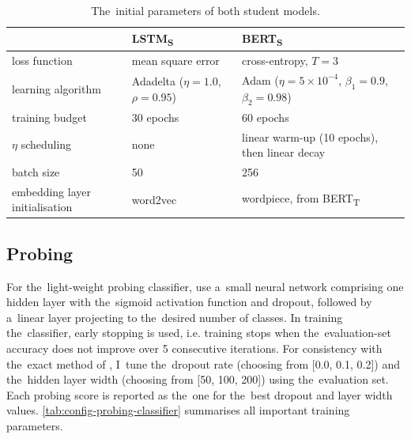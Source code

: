 \documentclass[bsc,frontabs,singlespacing,parskip,deptreport]{infthesis}
\def\BERTT{BERT\textsubscript{T}}
\def\BERTS{BERT\textsubscript{S}}
\def\LSTMS{LSTM\textsubscript{S}}
\begin{document}
{{{      \begin{table}[h!tb]
      \centering
      \footnotesize
      \begin{tabular}{P{0.18\textwidth} m{0.3\textwidth} m{0.3\textwidth} }
      \toprule
      & \LSTMS & \BERTS \\
      \toprule
      loss function & mean square error & cross-entropy, $T=3$ \\
      \hline
      learning algorithm & Adadelta ($\eta=1.0$, $\rho=0.95$) &  Adam ($\eta=5\times10^{-4}$, $\beta_1=0.9$, $\beta_2=0.98$) \\
      \hline
      training budget & 30 epochs & 60 epochs \\
      \hline
      $\eta$ scheduling & none & linear warm-up (10 epochs), then linear decay \\
      \hline
      batch size & 50 & 256 \\
      \hline
      embedding layer initialisation & word2vec & wordpiece, from \BERTT \\
      \bottomrule
      \end{tabular}
      \caption{The~initial parameters of both student models.}
      \label{tab:initial-configs}
      \end{table}
    }

    \subsection{Probing}{
      \label{sec:implementation-details-probing}
      For the~light-weight probing classifier, \citet{Conneau_2018} use a~small neural network comprising one hidden layer with the~sigmoid activation function and dropout, followed by a~linear layer projecting to the~desired number of classes. 
      In training the~classifier, early stopping is used, i.e. training stops when the~evaluation-set accuracy does not improve over 5 consecutive iterations.
      For consistency with the~exact method of \citeauthor{Conneau_2018}, I~tune the~dropout rate (choosing from [0.0, 0.1, 0.2]) and the~hidden layer width (choosing from [50, 100, 200]) using the~evaluation set. Each probing score is reported as the~one for the~best dropout and layer width values.
      \autoref{tab:config-probing-classifier} summarises all important training parameters.

}}}
\end{document}
